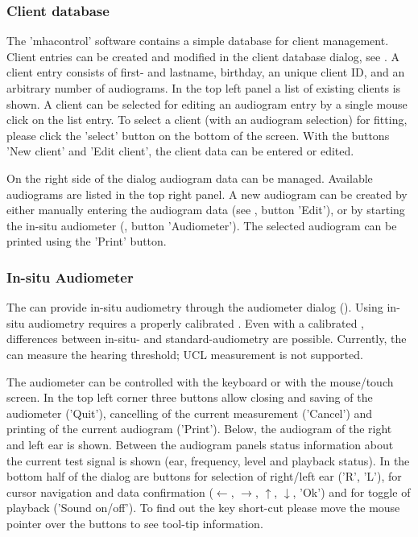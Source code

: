 \documentclass[11pt,a4paper,twoside]{article}
\newcommand{\+}{\discretionary{\mbox{\scriptsize$\hookleftarrow$}}{}{}}
\begin{document}
\subsubsection*{Client database}

The 'mhacontrol' software contains a simple database for client management.
%
Client entries can be created and modified in the client database
dialog, see .
%
A client entry consists of first- and lastname, birthday, an unique
client ID, and an arbitrary number of
audiograms.
%
In the top left panel a list of existing clients is shown.
%
A client can be selected for editing an audiogram entry by a single
mouse click on the list entry.
%
To select a client (with an audiogram selection) for fitting, please
click the 'select' button on the bottom of the screen.
%
With the buttons 'New client' and 'Edit client', the client data can
be entered or edited.


On the right side of the dialog audiogram data can be managed.
%
Available audiograms are listed in the top right panel.
%
A new audiogram can be created by either manually entering the
audiogram data (see , button
'Edit'), or by starting the in-situ audiometer
(, button 'Audiometer').
%
The selected audiogram can be printed using the 'Print' button.

\subsubsection*{In-situ Audiometer}%

The \mha{} can provide in-situ audiometry through the audiometer dialog
().
%
Using in-situ audiometry requires a properly calibrated \mha{}.
%
Even with a calibrated \mha{}, differences between in-situ- and
standard-audiometry are possible.
%
Currently, the \mha{} can measure the hearing threshold; UCL
measurement is not supported.

The audiometer can be controlled with the keyboard or with the
mouse/touch screen.
%
In the top left corner three buttons allow closing and saving of the
audiometer ('Quit'), cancelling of the current measurement ('Cancel')
and printing of the current audiogram ('Print').
%
Below, the audiogram of the right and left ear is shown.
%
Between the audiogram panels status information about the current test
signal is shown (ear, frequency, level and playback status).
%
In the bottom half of the dialog are buttons for selection of
right/left ear ('R', 'L'), for cursor navigation and data confirmation
($\leftarrow$, $\rightarrow$, $\uparrow$, $\downarrow$, 'Ok') and for
toggle of playback ('Sound on/off').
%
To find out the key short-cut please move the mouse pointer over the
buttons to see tool-tip information.
\end{document}
